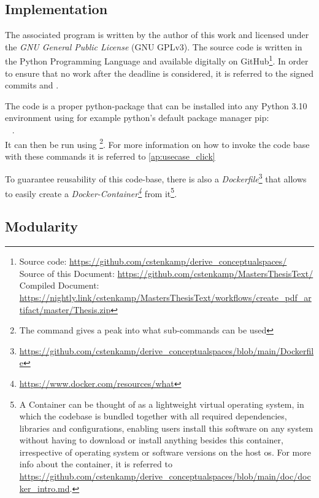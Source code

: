 \subsection{Implementation}

The associated program is written by the author of this work and licensed under the \emph{GNU General Public License} (GNU GPLv3). The source code is written in the Python Programming Language and available digitally on GitHub\footnote{Source code: \url{https://github.com/cstenkamp/derive_conceptualspaces/}\\Source of this Document: \url{https://github.com/cstenkamp/MastersThesisText/}\\Compiled Document: \url{https://nightly.link/cstenkamp/MastersThesisText/workflows/create_pdf_artifact/master/Thesis.zip}}. In order to ensure that no work after the deadline is considered, it is referred to the signed commits  and . 

The code is a proper python-package that can be installed into any Python 3.10 environment using for example python's default package manager pip:\\ ~ .\\ It can then be run using  \footnote{The command  gives a peak into what sub-commands can be used}. For more information on how to invoke the code base with these commands it is referred to \autoref{ap:usecase_click}

To guarantee reusability of this code-base, there is also a \emph{Dockerfile}\footnote{{\url{https://github.com/cstenkamp/derive_conceptualspaces/blob/main/Dockerfile}}} that allows to easily create a \emph{Docker-Container\footnote{\url{https://www.docker.com/resources/what}}} from it\footnote{A Container can be thought of as a lightweight virtual operating system, in which the codebase is bundled together with all required dependencies, libraries and configurations, enabling users install this software on any system without having to download or install anything besides this container, irrespective of operating system or software versions on the host \acrshort{os}. For more info about the container, it is referred to \url{https://github.com/cstenkamp/derive_conceptualspaces/blob/main/doc/docker_intro.md}.}.

\subsection{Modularity}

